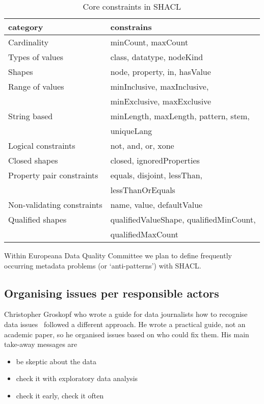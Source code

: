\begin{table}[ht]
\caption{Core constraints in SHACL}
\label{table:shacl}
\centering
\begin{tabular}{l|l}
category & constrains \\
\hline
Cardinality & minCount, maxCount \\
Types of values & class, datatype, nodeKind \\
Shapes & node, property, in, hasValue \\
Range of values & minInclusive, maxInclusive,\\
 &  minExclusive, maxExclusive  \\
String based & minLength, maxLength, pattern, stem,\\
 & uniqueLang \\
Logical constraints & not, and, or, xone \\
Closed shapes & closed, ignoredProperties \\
Property pair constraints & equals, disjoint, lessThan,\\
 & lessThanOrEquals \\
Non-validating constraints & name, value, defaultValue \\
Qualified shapes & qualifiedValueShape, qualifiedMinCount,\\  & qualifiedMaxCount \\
\end{tabular}
\end{table}

Within Europeana Data Quality Committee we plan to define frequently occurring metadata problems (or `anti-patterns') with SHACL.

\subsection{Organising issues per responsible actors}

Christopher Groskopf who wrote a guide for data journalists how to recognise data issues~\cite{groskopf2015} followed a different approach. He wrote a practical guide, not an academic paper, so he organised issues based on who could fix them. His main take-away messages are
\begin{itemize}
 \setlength{\parskip}{0pt}
 \setlength{\itemsep}{0pt plus 1pt}
 \item be skeptic about the data
 \item check it with exploratory data analysis
 \item check it early, check it often
\end{itemize}

